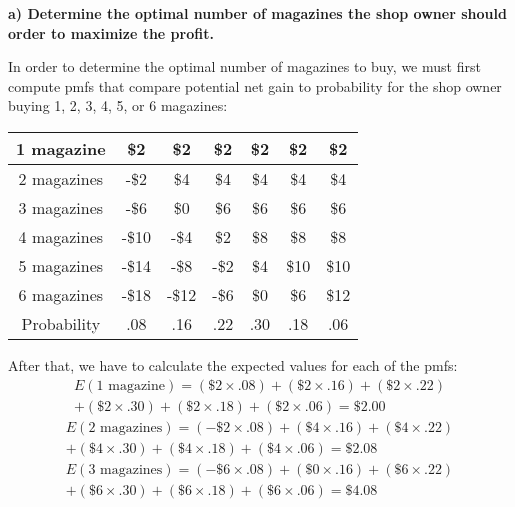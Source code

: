 \documentclass[12pt, letter]{article}
\begin{document}
\pagebreak

\textbf{a) Determine the optimal number of magazines the shop owner should order to maximize the profit.}
\begin{center}
	In order to determine the optimal number of magazines to buy, we must first compute pmfs that compare potential net gain to probability for the shop owner buying 1, 2, 3, 4, 5, or 6 magazines:
	\linebreak
	\linebreak
	\begin{tabular}{|c|c|c|c|c|c|c|}
		\hline
		1 magazine & \$2 & \$2 & \$2 & \$2 & \$2 & \$2 \\
		\hline
		2 magazines & -\$2 & \$4 & \$4 & \$4 & \$4 & \$4 \\
		\hline
		3 magazines & -\$6 & \$0 & \$6 & \$6 & \$6 & \$6 \\
		\hline
		4 magazines & -\$10 & -\$4 & \$2 & \$8 & \$8 & \$8 \\
		\hline
		5 magazines & -\$14 & -\$8 & -\$2 & \$4 & \$10 & \$10 \\
		\hline
		6 magazines & -\$18 & -\$12 & -\$6 & \$0 & \$6 & \$12 \\
		\hline
		Probability & .08 & .16 & .22 & .30 & .18 & .06 \\
		\hline
	\end{tabular}
	\linebreak
	\linebreak
	After that, we have to calculate the expected values for each of the pmfs:
	\begin{multline*}
		E(\text{1 magazine})=\left(\$2 \times .08\right)+\left(\$2 \times .16\right)+\left(\$2 \times .22\right) \\
		+\left(\$2 \times .30\right)+\left(\$2 \times .18\right)+\left(\$2 \times .06\right)=\$2.00
	\end{multline*}
	\begin{multline*}
		E(\text{2 magazines})=\left(-\$2 \times .08\right)+\left(\$4 \times .16\right)+\left(\$4 \times .22\right) \\
		+\left(\$4 \times .30\right)+\left(\$4 \times .18\right)+\left(\$4 \times .06\right)=\$2.08
	\end{multline*}
	\begin{multline*}
		E(\text{3 magazines})=\left(-\$6 \times .08\right)+\left(\$0 \times .16\right)+\left(\$6 \times .22\right) \\
		+\left(\$6 \times .30\right)+\left(\$6 \times .18\right)+\left(\$6 \times .06\right)=\$4.08
	\end{multline*}

\end{center}
\end{document}
